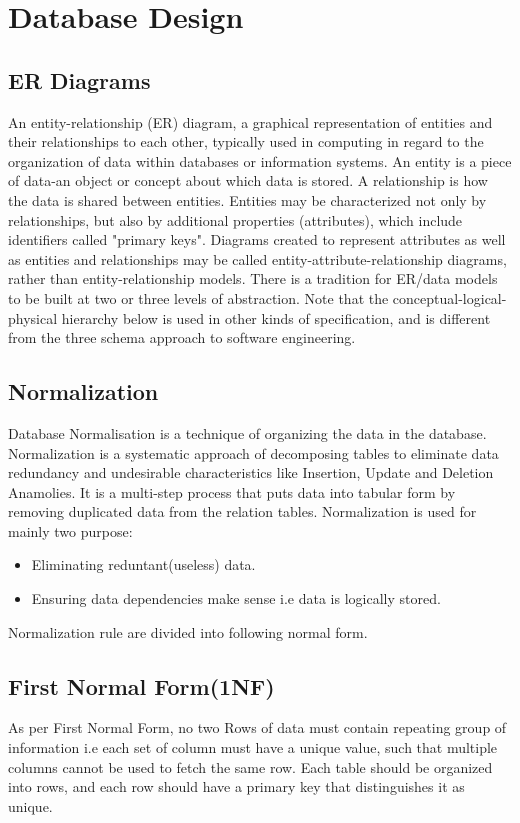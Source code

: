 \section{Database Design}
\subsection{ER Diagrams}
An entity-relationship (ER) diagram, a graphical representation of entities and their relationships to each other, typically used in computing in regard to the organization of data within databases or information systems. An entity is a piece of data-an object or concept about which data is stored. A relationship is how the data is shared between entities.
Entities may be characterized not only by relationships, but also by additional properties (attributes), which include identifiers called "primary keys". Diagrams created to represent attributes as well as entities and relationships may be called entity-attribute-relationship diagrams, rather than entity-relationship models.
There is a tradition for ER/data models to be built at two or three levels of abstraction. Note that the conceptual-logical-physical hierarchy below is used in other kinds of specification, and is different from the three schema approach to software engineering.
\subsection{Normalization}
Database Normalisation is a technique of organizing the data in the database. Normalization is a systematic approach of decomposing tables to eliminate data redundancy and undesirable characteristics like Insertion, Update and Deletion Anamolies. It is a multi-step process that puts data into tabular form by removing duplicated data from the relation tables.
Normalization is used for mainly two purpose:

\begin{itemize}
	\item Eliminating reduntant(useless) data.
	\item Ensuring data dependencies make sense i.e data is logically stored.  
\end{itemize}
Normalization rule are divided into following normal form.
\subsection{First Normal Form(1NF)}
As per First Normal Form, no two Rows of data must contain repeating group of information i.e each set of column must have a unique value, such that multiple columns cannot be used to fetch the same row. Each table should be organized into rows, and each row should have a primary key that distinguishes it as unique.

